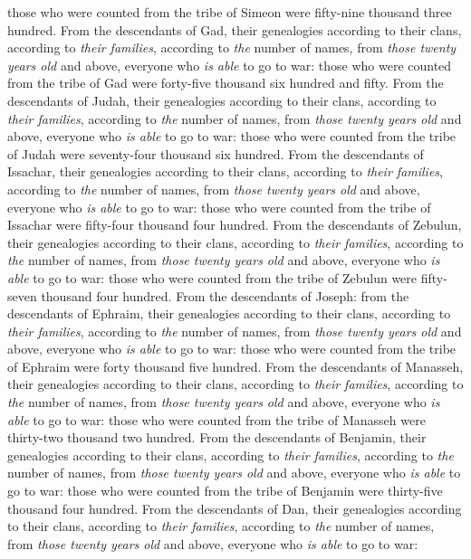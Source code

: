 \begin{biblechapter}
\verse those who were counted from the tribe of Simeon were fifty-nine thousand three hundred.
\verse From the descendants of Gad, their genealogies according to their clans, according to \textit{their families}, according to \textit{the} number of names, from \textit{those twenty years old} and above, everyone who \textit{is able} to go to war:
\verse those who were counted from the tribe of Gad were forty-five thousand six hundred and fifty.
\verse From the descendants of Judah, their genealogies according to their clans, according to \textit{their families}, according to \textit{the} number of names, from \textit{those twenty years old} and above, everyone who \textit{is able} to go to war:
\verse those who were counted from the tribe of Judah were seventy-four thousand six hundred.
\verse From the descendants of Issachar, their genealogies according to their clans, according to \textit{their families}, according to \textit{the} number of names, from \textit{those twenty years old} and above, everyone who \textit{is able} to go to war:
\verse those who were counted from the tribe of Issachar were fifty-four thousand four hundred.
\verse From the descendants of Zebulun, their genealogies according to their clans, according to \textit{their families}, according to \textit{the} number of names, from \textit{those twenty years old} and above, everyone who \textit{is able} to go to war:
\verse those who were counted from the tribe of Zebulun were fifty-seven thousand four hundred.
\verse From the descendants of Joseph: from the descendants of Ephraim, their genealogies according to their clans, according to \textit{their families}, according to \textit{the} number of names, from \textit{those twenty years old} and above, everyone who \textit{is able} to go to war:
\verse those who were counted from the tribe of Ephraim were forty thousand five hundred.
\verse From the descendants of Manasseh, their genealogies according to their clans, according to \textit{their families}, according to \textit{the} number of names, from \textit{those twenty years old} and above, everyone who \textit{is able} to go to war:
\verse those who were counted from the tribe of Manasseh were thirty-two thousand two hundred.
\verse From the descendants of Benjamin, their genealogies according to their clans, according to \textit{their families}, according to \textit{the} number of names, from \textit{those twenty years old} and above, everyone who \textit{is able} to go to war:
\verse those who were counted from the tribe of Benjamin were thirty-five thousand four hundred.
\verse From the descendants of Dan, their genealogies according to their clans, according to \textit{their families}, according to \textit{the} number of names, from \textit{those twenty years old} and above, everyone who \textit{is able} to go to war:

\end{biblechapter}
